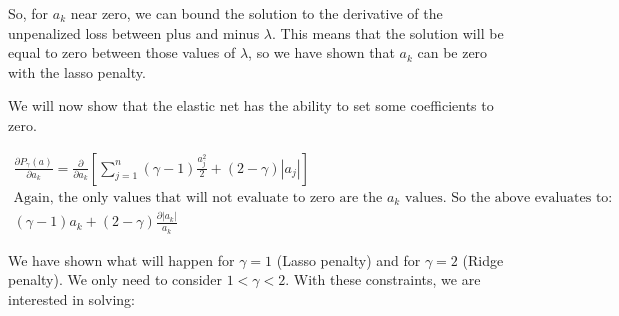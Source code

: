 \documentclass[11pt]{article}
\begin{document}
\vspace{5mm}
\noindent
So, for $a_{k}$ near zero, we can bound the solution to the derivative of the 
unpenalized loss between plus and minus $\lambda$. This means that the solution 
will be equal to zero between those values of $\lambda$, so we have shown that 
$a_{k}$ can be zero with the lasso penalty.

\vspace{5mm}
\noindent
We will now show that the elastic net has the ability to set some coefficients 
to zero.

\begin{gather*}
\frac{\partial P_{\gamma}(a)}{\partial a_{k}} = 
\frac{\partial}{\partial a_{k}}[
\sum_{j = 1}^{n} (\gamma - 1) \frac{a_{j}^{2}}{2} + 
(2 - \gamma) |a_{j}|
]\\
\text{Again, the only values that will not evaluate to zero are the } 
a_{k} 
\text{ values. So the above evaluates to:}\\
(\gamma - 1) a_{k} + (2 - \gamma) \frac{\partial |a_{k}|}{a_{k}}
\end{gather*}

\vspace{5mm}
\noindent
We have shown what will happen for $\gamma = 1$ (Lasso penalty) and for 
$\gamma = 2$ (Ridge penalty). We only need to consider $1 < \gamma < 2$. With 
these constraints, we are interested in solving:
\end{document}
